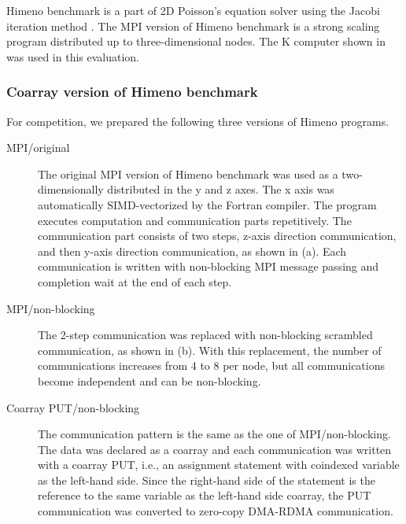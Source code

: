 Himeno benchmark is a part of 2D Poisson's equation solver using the Jacobi 
iteration method \cite{himeno}. 
The MPI version of Himeno benchmark is a strong scaling program distributed 
up to three-dimensional nodes. 
%
The K computer shown in  was used in this evaluation.

\subsubsection{Coarray version of Himeno benchmark}

For competition, we prepared the following three versions of Himeno programs.

\begin{description}
\item [MPI/original]
The original MPI version of Himeno benchmark was used as a two-dimensionally 
distributed in the y and z axes. The x axis was automatically SIMD-vectorized 
by the Fortran compiler.
The program executes computation and communication parts repetitively.
The communication part consists of two steps, z-axis direction communication, 
and then y-axis direction communication, as shown in  (a).
Each communication is written with non-blocking MPI message passing and
completion wait at the end of each step.

\item [MPI/non-blocking]
The 2-step communication was replaced with non-blocking scrambled communication,
as shown in  (b).
With this replacement, the number of communications increases from 4 to 8 
per node, but all communications become independent and can be non-blocking.

\item [Coarray PUT/non-blocking]
The communication pattern is the same as the one of MPI/non-blocking.
The data was declared as a coarray and each communication was written with
a coarray PUT, i.e., an assignment statement with coindexed variable as 
the left-hand side. Since the right-hand side of the statement is the reference
to the same variable as the left-hand side coarray, the PUT communication
was converted to zero-copy DMA-RDMA communication.

\end{description}

